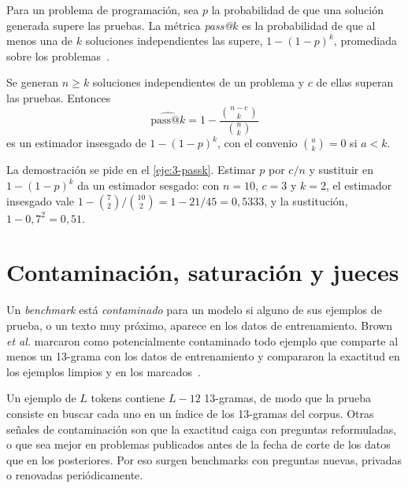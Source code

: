 \addtocounter{definicion}{1}%

\begin{definicion}[pass@$k$]\label{def:passk}
Para un problema de programación, sea $p$ la probabilidad de que una solución generada supere las pruebas. La métrica \emph{pass@$k$} es la probabilidad de que al menos una de $k$ soluciones independientes las supere, $1-(1-p)^{k}$, promediada sobre los problemas~\cite[§2.1]{chen-codex}.
\end{definicion}

\begin{proposicion}\label{prop:passk}
Se generan $n\ge k$ soluciones independientes de un problema y $c$ de ellas superan las pruebas. Entonces
\[
\widehat{\text{pass@}k}=1-\frac{\binom{n-c}{k}}{\binom{n}{k}}
\]
es un estimador insesgado de $1-(1-p)^{k}$, con el convenio $\binom{a}{k}=0$ si $a<k$.
\end{proposicion}

La demostración se pide en el \cref{eje:3-passk}. Estimar $p$ por $c/n$ y sustituir en $1-(1-p)^{k}$ da un estimador sesgado: con $n=10$, $c=3$ y $k=2$, el estimador insesgado vale $1-\binom72/\binom{10}2=1-21/45=0{,}5333$, y la sustitución, $1-0{,}7^{2}=0{,}51$.

\section{Contaminación, saturación y jueces}

\begin{definicion}[Contaminación]\label{def:contaminacion}
Un \emph{benchmark} está \emph{contaminado} para un modelo si alguno de sus ejemplos de prueba, o un texto muy próximo, aparece en los datos de entrenamiento. Brown \emph{et al.} marcaron como potencialmente contaminado todo ejemplo que comparte al menos un 13-grama con los datos de entrenamiento y compararon la exactitud en los ejemplos limpios y en los marcados~\cite[§4]{brown}.
\end{definicion}

Un ejemplo de $L$ tokens contiene $L-12$ 13-gramas, de modo que la prueba consiste en buscar cada uno en un índice de los 13-gramas del corpus. Otras señales de contaminación son que la exactitud caiga con preguntas reformuladas, o que sea mejor en problemas publicados antes de la fecha de corte de los datos que en los posteriores. Por eso surgen benchmarks con preguntas nuevas, privadas o renovadas periódicamente.

